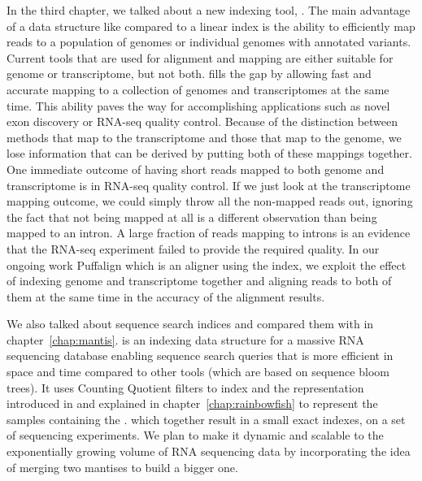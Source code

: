 In the third chapter, we talked about a new indexing tool, \pufferfish.
The main advantage of a data structure like \pufferfish compared to a linear index
is the ability to efficiently map reads to a population of genomes or individual genomes
with annotated variants.
Current tools that are used for alignment and mapping are either suitable for genome or transcriptome,
but not both. \pufferfish fills the gap by allowing fast and accurate mapping
to a collection of genomes and transcriptomes at the same time.
This ability paves the way for accomplishing applications such as novel exon discovery
or RNA-seq quality control.
Because of the distinction between methods that map to the transcriptome
and those that map to the genome,
we lose information that can be derived by putting both of these mappings together.
One immediate outcome of having short reads mapped to both genome and transcriptome
is in RNA-seq quality control.
If we just look at the transcriptome mapping outcome,
we could simply throw all the non-mapped reads out,
ignoring the fact that not being mapped at all is a different observation than being mapped to an intron.
A large fraction of reads mapping to introns is an evidence that the RNA-seq experiment
failed to provide the required quality.
In our ongoing work Puffalign which is an aligner using the \pufferfish index,
we exploit the effect of indexing genome and transcriptome together and aligning reads to
both of them at the same time in the accuracy of the alignment results.

We also talked about sequence search indices and compared them with \mantis
in chapter~\ref{chap:mantis}.
\mantis is an indexing data structure for a massive RNA sequencing database enabling sequence
search queries that is more efficient in space and time compared to other tools
(which are based on sequence bloom trees). It uses Counting Quotient filters
to index \kmers and the representation introduced in \rainbowfish
and explained in chapter~\ref{chap:rainbowfish} to represent the samples containing the \kmer.
which together result in a small exact indexes, on a set of sequencing experiments.
We plan to make it dynamic and scalable to the exponentially
growing volume of RNA sequencing data by incorporating the idea of merging two mantises to build a bigger one.
